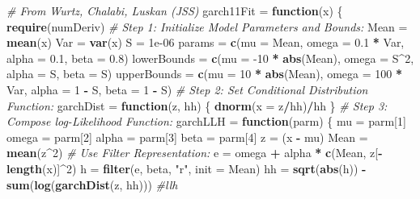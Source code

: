 \documentclass[]{book}
\newenvironment{Shaded}{\begin{snugshade}}{\end{snugshade}}
\newcommand{\CommentTok}[1]{\textcolor[rgb]{0.56,0.35,0.01}{\textit{#1}}}
\newcommand{\ControlFlowTok}[1]{\textcolor[rgb]{0.13,0.29,0.53}{\textbf{#1}}}
\newcommand{\DataTypeTok}[1]{\textcolor[rgb]{0.13,0.29,0.53}{#1}}
\newcommand{\DecValTok}[1]{\textcolor[rgb]{0.00,0.00,0.81}{#1}}
\newcommand{\FloatTok}[1]{\textcolor[rgb]{0.00,0.00,0.81}{#1}}
\newcommand{\KeywordTok}[1]{\textcolor[rgb]{0.13,0.29,0.53}{\textbf{#1}}}
\newcommand{\NormalTok}[1]{#1}
\newcommand{\OperatorTok}[1]{\textcolor[rgb]{0.81,0.36,0.00}{\textbf{#1}}}
\newcommand{\StringTok}[1]{\textcolor[rgb]{0.31,0.60,0.02}{#1}}
\begin{document}
\begin{Shaded}
\begin{Highlighting}[]
\CommentTok{# From Wurtz, Chalabi, Luskan (JSS)}
\NormalTok{garch11Fit =}\StringTok{ }\ControlFlowTok{function}\NormalTok{(x) \{}
    \KeywordTok{require}\NormalTok{(numDeriv)}
    \CommentTok{# Step 1: Initialize Model Parameters and Bounds:}
\NormalTok{    Mean =}\StringTok{ }\KeywordTok{mean}\NormalTok{(x)}
\NormalTok{    Var =}\StringTok{ }\KeywordTok{var}\NormalTok{(x)}
\NormalTok{    S =}\StringTok{ }\FloatTok{1e-06}
\NormalTok{    params =}\StringTok{ }\KeywordTok{c}\NormalTok{(}\DataTypeTok{mu =}\NormalTok{ Mean, }\DataTypeTok{omega =} \FloatTok{0.1} \OperatorTok{*}\StringTok{ }\NormalTok{Var, }\DataTypeTok{alpha =} \FloatTok{0.1}\NormalTok{, }\DataTypeTok{beta =} \FloatTok{0.8}\NormalTok{)}
\NormalTok{    lowerBounds =}\StringTok{ }\KeywordTok{c}\NormalTok{(}\DataTypeTok{mu =} \DecValTok{-10} \OperatorTok{*}\StringTok{ }\KeywordTok{abs}\NormalTok{(Mean), }\DataTypeTok{omega =}\NormalTok{ S}\OperatorTok{^}\DecValTok{2}\NormalTok{, }\DataTypeTok{alpha =}\NormalTok{ S, }\DataTypeTok{beta =}\NormalTok{ S)}
\NormalTok{    upperBounds =}\StringTok{ }\KeywordTok{c}\NormalTok{(}\DataTypeTok{mu =} \DecValTok{10} \OperatorTok{*}\StringTok{ }\KeywordTok{abs}\NormalTok{(Mean), }\DataTypeTok{omega =} \DecValTok{100} \OperatorTok{*}\StringTok{ }\NormalTok{Var, }\DataTypeTok{alpha =} \DecValTok{1} \OperatorTok{-}\StringTok{ }\NormalTok{S, }\DataTypeTok{beta =} \DecValTok{1} \OperatorTok{-}\StringTok{ }
\StringTok{        }\NormalTok{S)}
    \CommentTok{# Step 2: Set Conditional Distribution Function:}
\NormalTok{    garchDist =}\StringTok{ }\ControlFlowTok{function}\NormalTok{(z, hh) \{}
        \KeywordTok{dnorm}\NormalTok{(}\DataTypeTok{x =}\NormalTok{ z}\OperatorTok{/}\NormalTok{hh)}\OperatorTok{/}\NormalTok{hh}
\NormalTok{    \}}
    \CommentTok{# Step 3: Compose log-Likelihood Function:}
\NormalTok{    garchLLH =}\StringTok{ }\ControlFlowTok{function}\NormalTok{(parm) \{}
\NormalTok{        mu =}\StringTok{ }\NormalTok{parm[}\DecValTok{1}\NormalTok{]}
\NormalTok{        omega =}\StringTok{ }\NormalTok{parm[}\DecValTok{2}\NormalTok{]}
\NormalTok{        alpha =}\StringTok{ }\NormalTok{parm[}\DecValTok{3}\NormalTok{]}
\NormalTok{        beta =}\StringTok{ }\NormalTok{parm[}\DecValTok{4}\NormalTok{]}
\NormalTok{        z =}\StringTok{ }\NormalTok{(x }\OperatorTok{-}\StringTok{ }\NormalTok{mu)}
\NormalTok{        Mean =}\StringTok{ }\KeywordTok{mean}\NormalTok{(z}\OperatorTok{^}\DecValTok{2}\NormalTok{)}
        \CommentTok{# Use Filter Representation:}
\NormalTok{        e =}\StringTok{ }\NormalTok{omega }\OperatorTok{+}\StringTok{ }\NormalTok{alpha }\OperatorTok{*}\StringTok{ }\KeywordTok{c}\NormalTok{(Mean, z[}\OperatorTok{-}\KeywordTok{length}\NormalTok{(x)]}\OperatorTok{^}\DecValTok{2}\NormalTok{)}
\NormalTok{        h =}\StringTok{ }\KeywordTok{filter}\NormalTok{(e, beta, }\StringTok{"r"}\NormalTok{, }\DataTypeTok{init =}\NormalTok{ Mean)}
\NormalTok{        hh =}\StringTok{ }\KeywordTok{sqrt}\NormalTok{(}\KeywordTok{abs}\NormalTok{(h))}
        \OperatorTok{-}\KeywordTok{sum}\NormalTok{(}\KeywordTok{log}\NormalTok{(}\KeywordTok{garchDist}\NormalTok{(z, hh)))  }\CommentTok{#llh}
        

\end{Highlighting}
\end{Shaded}
\end{document}

